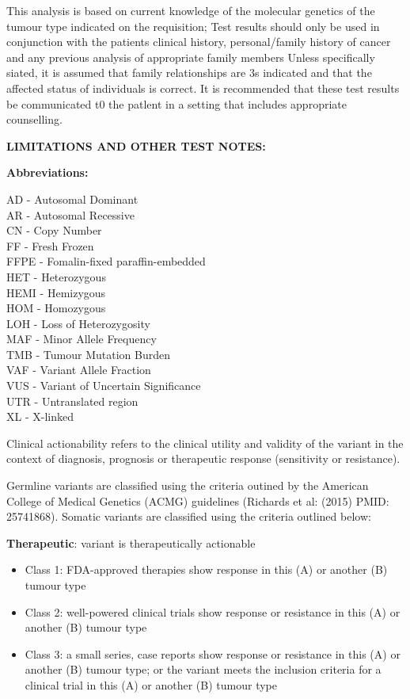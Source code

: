 \documentclass[8pt,letterpaper]{extarticle}
\begin{document}
{This analysis is based on current knowledge of the molecular genetics of the tumour type indicated on the requisition; Test results should only be used in conjunction with the patients clinical history, personal/family history of cancer and any previous analysis of appropriate family members Unless specifically siated, it is assumed that family relationships are 3s indicated and that the affected status of individuals is correct. It is recommended that these test results be communicated t0 the patlent in a setting that includes appropriate counselling.

{\bf LIMITATIONS AND OTHER TEST NOTES:}

{\bf Abbreviations:}

AD - Autosomal Dominant \\
AR - Autosomal Recessive \\
CN - Copy Number \\
FF - Fresh Frozen \\
FFPE - Fomalin-fixed paraffin-embedded \\
HET - Heterozygous \\
HEMI - Hemizygous \\
HOM - Homozygous \\
LOH - Loss of Heterozygosity\\
MAF - Minor Allele Frequency \\
TMB - Tumour Mutation Burden \\
VAF - Variant Allele Fraction \\
VUS - Variant of Uncertain Significance \\
UTR - Untranslated region \\
XL - X-linked

Clinical actionability refers to the clinical utility and validity of the variant in the context of diagnosis, prognosis or therapeutic response (sensitivity or resistance).

Germline variants are classified using the criteria outined by the American College of Medical Genetics (ACMG) guidelines (Richards et al: (2015) PMID: 25741868). Somatic variants are classified using the criteria outlined below: 

{\bf Therapeutic}: variant is therapeutically actionable 
\begin{itemize}
  \setlength\itemsep{1pt}
  \item Class 1: FDA-approved therapies show response in this (A) or another (B) tumour type 
  \item Class 2: well-powered clinical trials show response or resistance in this (A) or another (B) tumour type 
  \item Class 3: a small series, case reports show response or resistance in this (A) or another (B) tumour type; or the variant meets the inclusion criteria for a clinical trial in this (A) or another (B) tumour type 
\end{itemize}

}
\end{document}
